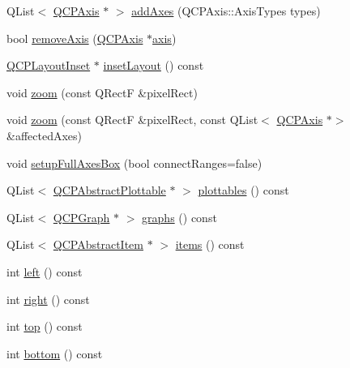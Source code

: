 \begin{DoxyCompactItemize}
\item 
Q\+List$<$ \mbox{\hyperlink{class_q_c_p_axis}{Q\+C\+P\+Axis}} $\ast$ $>$ \mbox{\hyperlink{class_q_c_p_axis_rect_a792e1f3d9cb1591fca135bb0de9b81fc}{add\+Axes}} (Q\+C\+P\+Axis\+::\+Axis\+Types types)
\item 
bool \mbox{\hyperlink{class_q_c_p_axis_rect_a03c39cd9704f0d36fb6cf980cdddcbaa}{remove\+Axis}} (\mbox{\hyperlink{class_q_c_p_axis}{Q\+C\+P\+Axis}} $\ast$\mbox{\hyperlink{class_q_c_p_axis_rect_a583ae4f6d78b601b732183f6cabecbe1}{axis}})
\item 
\mbox{\hyperlink{class_q_c_p_layout_inset}{Q\+C\+P\+Layout\+Inset}} $\ast$ \mbox{\hyperlink{class_q_c_p_axis_rect_a949f803466619924c7018df4b511ae10}{inset\+Layout}} () const
\item 
void \mbox{\hyperlink{class_q_c_p_axis_rect_a5fc8460564e81dcc2a9343dc8bc1fe67}{zoom}} (const Q\+RectF \&pixel\+Rect)
\item 
void \mbox{\hyperlink{class_q_c_p_axis_rect_a6a39fb3aea60a8c503bdcb3f0477d2f6}{zoom}} (const Q\+RectF \&pixel\+Rect, const Q\+List$<$ \mbox{\hyperlink{class_q_c_p_axis}{Q\+C\+P\+Axis}} $\ast$$>$ \&affected\+Axes)
\item 
void \mbox{\hyperlink{class_q_c_p_axis_rect_a5fa906175447b14206954f77fc7f1ef4}{setup\+Full\+Axes\+Box}} (bool connect\+Ranges=false)
\item 
Q\+List$<$ \mbox{\hyperlink{class_q_c_p_abstract_plottable}{Q\+C\+P\+Abstract\+Plottable}} $\ast$ $>$ \mbox{\hyperlink{class_q_c_p_axis_rect_a587d073a97b27bc7293fab4b2774ad59}{plottables}} () const
\item 
Q\+List$<$ \mbox{\hyperlink{class_q_c_p_graph}{Q\+C\+P\+Graph}} $\ast$ $>$ \mbox{\hyperlink{class_q_c_p_axis_rect_a2d9ded3eca97be1fcb5867949391bb88}{graphs}} () const
\item 
Q\+List$<$ \mbox{\hyperlink{class_q_c_p_abstract_item}{Q\+C\+P\+Abstract\+Item}} $\ast$ $>$ \mbox{\hyperlink{class_q_c_p_axis_rect_a03c113a2175448300ee8f944e24776ba}{items}} () const
\item 
int \mbox{\hyperlink{class_q_c_p_axis_rect_afb4a3de02046b20b9310bdb8fca781c3}{left}} () const
\item 
int \mbox{\hyperlink{class_q_c_p_axis_rect_a3f819d4a1b2193723d1fdafc573eea10}{right}} () const
\item 
int \mbox{\hyperlink{class_q_c_p_axis_rect_a45dbad181cbb9f09d068dbb76c817c95}{top}} () const
\item 
int \mbox{\hyperlink{class_q_c_p_axis_rect_acefdf1abaa8a8ab681e906cc2be9581e}{bottom}} () const
$$
\end{DoxyCompactItemize}
